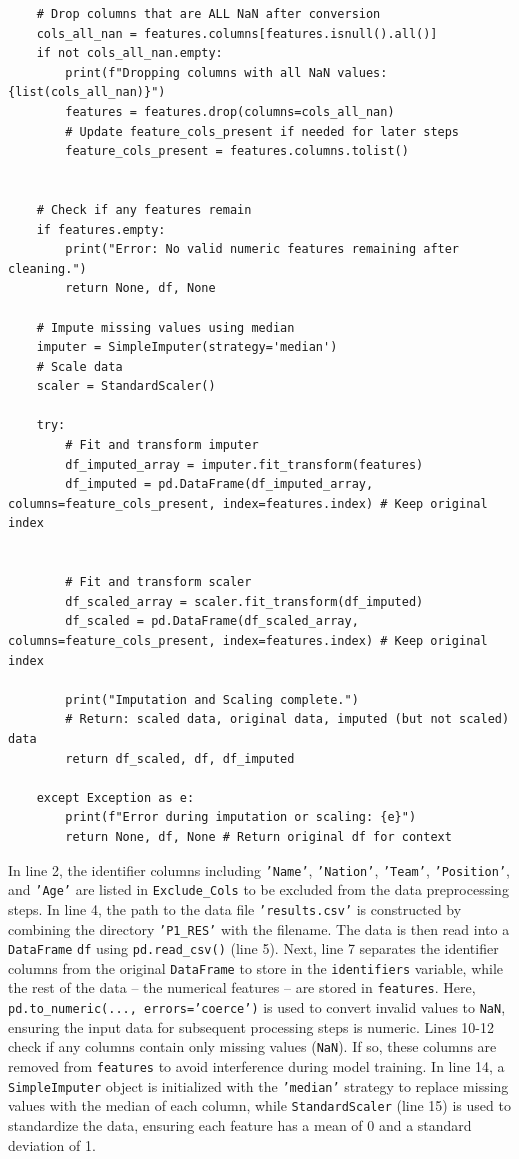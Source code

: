 \documentclass[12pt]{report}
\begin{document}
{{{\begin{lstlisting}
    # Drop columns that are ALL NaN after conversion
    cols_all_nan = features.columns[features.isnull().all()]
    if not cols_all_nan.empty:
        print(f"Dropping columns with all NaN values: {list(cols_all_nan)}")
        features = features.drop(columns=cols_all_nan)
        # Update feature_cols_present if needed for later steps
        feature_cols_present = features.columns.tolist()


    # Check if any features remain
    if features.empty:
        print("Error: No valid numeric features remaining after cleaning.")
        return None, df, None

    # Impute missing values using median
    imputer = SimpleImputer(strategy='median')
    # Scale data
    scaler = StandardScaler()

    try:
        # Fit and transform imputer
        df_imputed_array = imputer.fit_transform(features)
        df_imputed = pd.DataFrame(df_imputed_array, columns=feature_cols_present, index=features.index) # Keep original index


        # Fit and transform scaler
        df_scaled_array = scaler.fit_transform(df_imputed)
        df_scaled = pd.DataFrame(df_scaled_array, columns=feature_cols_present, index=features.index) # Keep original index

        print("Imputation and Scaling complete.")
        # Return: scaled data, original data, imputed (but not scaled) data
        return df_scaled, df, df_imputed

    except Exception as e:
        print(f"Error during imputation or scaling: {e}")
        return None, df, None # Return original df for context

\end{lstlisting}
In line 2, the identifier columns including \texttt{'Name'}, \texttt{'Nation'}, \texttt{'Team'}, \texttt{'Position'}, and \texttt{'Age'} are listed in \texttt{Exclude\_Cols} to be excluded from the data preprocessing steps. In line 4, the path to the data file \texttt{'results.csv'} is constructed by combining the directory \texttt{'P1\_RES'} with the filename. The data is then read into a \texttt{DataFrame} \texttt{df} using \texttt{pd.read\_csv()} (line 5). Next, line 7 separates the identifier columns from the original \texttt{DataFrame} to store in the \texttt{identifiers} variable, while the rest of the data – the numerical features – are stored in \texttt{features}. Here, \texttt{pd.to\_numeric(..., errors='coerce')} is used to convert invalid values to \texttt{NaN}, ensuring the input data for subsequent processing steps is numeric. Lines 10-12 check if any columns contain only missing values (\texttt{NaN}). If so, these columns are removed from \texttt{features} to avoid interference during model training. In line 14, a \texttt{SimpleImputer} object is initialized with the \texttt{'median'} strategy to replace missing values with the median of each column, while \texttt{StandardScaler} (line 15) is used to standardize the data, ensuring each feature has a mean of 0 and a standard deviation of 1.

}}}
\end{document}
